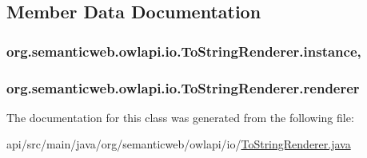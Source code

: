 \subsection{Member Data Documentation}
\hypertarget{classorg_1_1semanticweb_1_1owlapi_1_1io_1_1_to_string_renderer_aea5b4b417c27de0ba852ba6579c4c43c}{
\subsubsection[{instance}]{ org.\-semanticweb.\-owlapi.\-io.\-To\-String\-Renderer.\-instance\hspace{0.3cm}{\ttfamily [static]}, {\ttfamily [private]}}}\label{classorg_1_1semanticweb_1_1owlapi_1_1io_1_1_to_string_renderer_aea5b4b417c27de0ba852ba6579c4c43c}
\hypertarget{classorg_1_1semanticweb_1_1owlapi_1_1io_1_1_to_string_renderer_ab952a28fb0945e2b724a6fb549f47cd8}{
\subsubsection[{renderer}]{ org.\-semanticweb.\-owlapi.\-io.\-To\-String\-Renderer.\-renderer\hspace{0.3cm}{\ttfamily [private]}}}\label{classorg_1_1semanticweb_1_1owlapi_1_1io_1_1_to_string_renderer_ab952a28fb0945e2b724a6fb549f47cd8}


The documentation for this class was generated from the following file\-:\begin{DoxyCompactItemize}
\item 
api/src/main/java/org/semanticweb/owlapi/io/\hyperlink{_to_string_renderer_8java}{To\-String\-Renderer.\-java}\end{DoxyCompactItemize}
